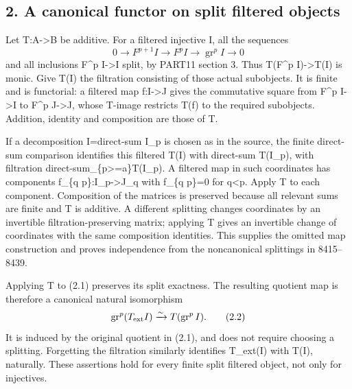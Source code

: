 \subsection{2. A canonical functor on split filtered objects}\label{proofs-8352-8772-a-canonical-functor-on-split-filtered-objects}

Let T:\allowbreak{}A\allowbreak{}->B be additive. For a filtered injective I,\allowbreak{} all the sequences \[
 0\to F^{p+1}I\longrightarrow F^p I
      \longrightarrow \operatorname{gr}^p I\to0              \tag{2.1}
\] and all inclusions F\^{}p I\allowbreak{}->I split,\allowbreak{} by PART11 section 3. Thus T(F\^{}p I)\allowbreak{}\allowbreak{}->T(I)\allowbreak{} is monic. Give T(I)\allowbreak{} the filtration consisting of those actual subobjects. It is finite and is functorial:\allowbreak{} a filtered map f:\allowbreak{}I\allowbreak{}->J gives the commutative square from F\^{}p I\allowbreak{}->I to F\^{}p J\allowbreak{}->J,\allowbreak{} whose T-image restricts T(f)\allowbreak{} to the required subobjects. Addition,\allowbreak{} identity and composition are those of T.

If a decomposition I\allowbreak{}=direct-sum I\_\allowbreak{}p is chosen as in the source,\allowbreak{} the finite direct-sum comparison identifies this filtered T(I)\allowbreak{} with direct-sum T(I\_\allowbreak{}p)\allowbreak{},\allowbreak{} with filtration direct-sum\_\allowbreak{}\{p>\allowbreak{}=a\}T(I\_\allowbreak{}p)\allowbreak{}. A filtered map in such coordinates has components f\_\allowbreak{}\{q p\}:\allowbreak{}I\_\allowbreak{}p\allowbreak{}->J\_\allowbreak{}q with f\_\allowbreak{}\{q p\}\allowbreak{}=0 for q\textless p. Apply T to each component. Composition of the matrices is preserved because all relevant sums are finite and T is additive. A different splitting changes coordinates by an invertible filtration-preserving matrix; applying T gives an invertible change of coordinates with the same composition identities. This supplies the omitted map construction and proves independence from the noncanonical splittings in 8415–\allowbreak{}8439.

Applying T to (2.1)\allowbreak{} preserves its split exactness. The resulting quotient map is therefore a canonical natural isomorphism \[
 \operatorname{gr}^p(T_{\rm ext}I)
       \xrightarrow{\sim}T(\operatorname{gr}^p I).            \tag{2.2}
\] It is induced by the original quotient in (2.1)\allowbreak{},\allowbreak{} and does not require choosing a splitting. Forgetting the filtration similarly identifies T\_\allowbreak{}ext(I)\allowbreak{} with T(I)\allowbreak{},\allowbreak{} naturally. These assertions hold for every finite split filtered object,\allowbreak{} not only for injectives.

